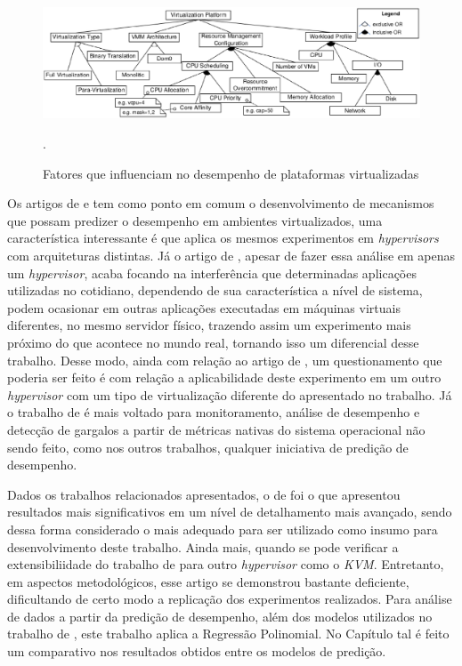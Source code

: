 \begin{figure}[!htb]
\centering
\includegraphics [keepaspectratio=true,scale=0.50]{figuras/factors_influence.eps}
\caption{Fatores que influenciam no desempenho de plataformas virtualizadas}
\cite{huber2011}.
\label{influence_factors}
\end{figure} 

Os artigos de  e  tem como ponto em comum o desenvolvimento de mecanismos que possam predizer o desempenho em ambientes virtualizados, uma característica interessante é que  aplica os mesmos experimentos em \textit{hypervisors} com arquiteturas distintas. Já o artigo de , apesar de fazer essa análise em apenas um \textit{hypervisor}, acaba focando na interferência que determinadas aplicações utilizadas no cotidiano, dependendo de sua característica a nível de sistema, podem ocasionar em outras aplicações executadas em máquinas virtuais diferentes, no mesmo servidor físico, trazendo assim um experimento mais próximo do que acontece no mundo real, tornando isso um diferencial desse trabalho. Desse modo, ainda com relação ao artigo de , um questionamento que poderia ser feito é com relação a aplicabilidade deste experimento em um outro \textit{hypervisor} com um tipo de virtualização diferente do apresentado no trabalho. Já o trabalho de  é mais voltado para monitoramento, análise de desempenho e detecção de gargalos a partir de métricas nativas do sistema operacional não sendo feito, como nos outros trabalhos, qualquer iniciativa de predição de desempenho.

Dados os trabalhos relacionados apresentados, o de  foi o que apresentou resultados mais significativos em um nível de detalhamento mais avançado, sendo dessa forma considerado o mais adequado para ser utilizado como insumo para desenvolvimento deste trabalho. Ainda mais, quando se pode verificar a extensibiliidade do trabalho de  para outro \textit{hypervisor} como o \textit{KVM}. Entretanto, em aspectos metodológicos, esse artigo se demonstrou bastante deficiente, dificultando de certo modo a replicação dos experimentos realizados. Para análise de dados a partir da predição de desempenho, além dos modelos utilizados no trabalho de , este trabalho aplica a Regressão Polinomial. No Capítulo tal é feito um comparativo nos resultados obtidos entre os modelos de predição.   %

